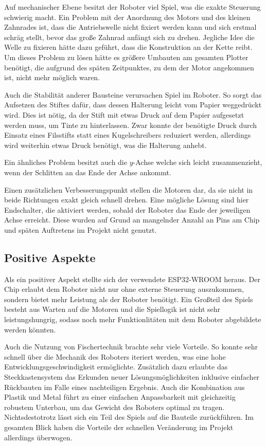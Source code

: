 \documentclass[conference,compsoc,final,a4paper]{IEEEtran}
\begin{document}
Auf mechanischer Ebene besitzt der Roboter viel Spiel, was die exakte Steuerung schwierig macht. Ein Problem mit der Anordnung
des Motors und des kleinen Zahnrades ist, dass die
Antriebswelle nicht fixiert werden kann und sich erstmal schräg stellt, bevor das große Zahnrad anfängt sich zu drehen. Jegliche
Idee die Welle zu fixieren hätte dazu geführt, dass die Konstruktion an der Kette reibt. Um dieses Problem zu lösen hätte es größere
Umbauten am gesamten Plotter benötigt, die aufgrund des späten Zeitpunktes, zu dem der Motor angekommen ist, nicht mehr möglich waren.

Auch die Stabilität anderer Bausteine verursachen Spiel im Roboter. So sorgt das Aufsetzen des Stiftes dafür, dass dessen Halterung
leicht vom Papier weggedrückt wird. Dies ist nötig, da der Stift mit etwas Druck auf dem Papier aufgesetzt werden muss, um
Tinte zu hinterlassen. Zwar konnte der benötigte Druck durch Einsatz eines Filsstifts statt eines Kugelschreibers reduziert werden,
allerdings wird weiterhin etwas Druck benötigt, was die Halterung anhebt.

Ein ähnliches Problem besitzt auch die $y$-Achse welche sich leicht zusammenzieht, wenn der Schlitten an das Ende der Achse ankommt.

Einen zusätzlichen Verbesserungspunkt stellen die Motoren dar, da sie nicht in beide Richtungen exakt gleich schnell drehen. Eine
mögliche Lösung sind hier Endschalter, die aktiviert werden, sobald der Roboter das Ende der jeweiligen Achse erreicht. Diese wurden
auf Grund an mangelnder Anzahl an Pins am Chip und späten Auftretens im Projekt nicht genutzt.

\subsection{Positive Aspekte}

Als ein positiver Aspekt stellte sich der verwendete ESP32-WROOM heraus. Der Chip erlaubt dem Roboter nicht nur ohne externe Steuerung
auszukommen, sondern bietet mehr Leistung als der Roboter benötigt. Ein Großteil des Spiels besteht aus Warten auf die Motoren und die
Spiellogik ist nicht sehr leistungshungrig, sodass noch mehr Funktionlitäten mit dem Roboter abgebildete werden könnten.

Auch die Nutzung von Fischertechnik brachte sehr viele Vorteile. So konnte sehr schnell über die Mechanik des Roboters iteriert werden,
was eine hohe Entwicklungsgeschwindigkeit ermöglichte. Zusätzlich dazu erlaubte das Steckkastensystem das Erkunden neuer Lösungsmöglichkeiten
inklusive einfacher Rückbauten im Falle eines nachteiligen Ergebnis. Auch die Kombination aus Plastik und Metal führt zu einer einfachen 
Anpassbarkeit mit gleichzeitig robustem Unterbau, um das Gewicht des Roboters optimal zu tragen. Nichtsdestotrotz lässt sich ein Teil des
Spiels auf die Bauteile zurückführen. Im gesamten Blick haben die Vorteile der schnellen Veränderung im Projekt allerdings überwogen.
\end{document}
